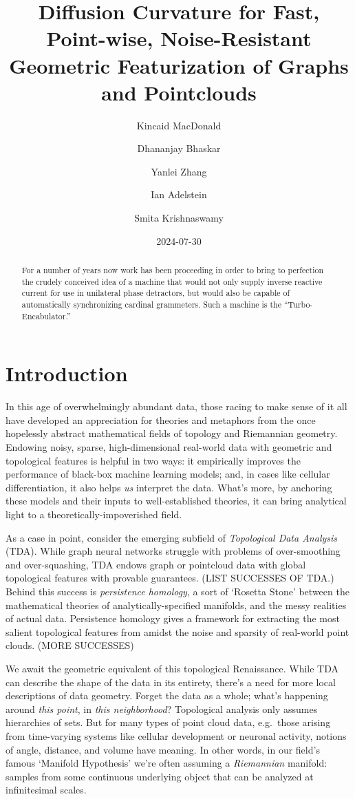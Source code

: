 \documentclass[
  letterpaper,
  DIV=11,
  numbers=noendperiod]{scrartcl}
\title{Diffusion Curvature for Fast, Point-wise, Noise-Resistant
Geometric Featurization of Graphs and Pointclouds}
\author{Kincaid MacDonald \and Dhananjay Bhaskar \and Yanlei
Zhang \and Ian Adelstein \and Smita Krishnaswamy}
\date{2024-07-30}
\theoremstyle{plain}
\theoremstyle{plain}
\theoremstyle{definition}
\theoremstyle{plain}
\theoremstyle{definition}
\theoremstyle{plain}
\theoremstyle{remark}
\begin{document}
\maketitle
\begin{abstract}
For a number of years now work has been proceeding in order to bring to
perfection the crudely conceived idea of a machine that would not only
supply inverse reactive current for use in unilateral phase detractors,
but would also be capable of automatically synchronizing cardinal
grammeters. Such a machine is the ``Turbo-Encabulator.''
\end{abstract}


\newcommand\Kaly[1]{\textcolor{blue}{Kaly: [[[#1]]]}}

\section{Introduction}\label{introduction}

In this age of overwhelmingly abundant data, those racing to make sense
of it all have developed an appreciation for theories and metaphors from
the once hopelessly abstract mathematical fields of topology and
Riemannian geometry. Endowing noisy, sparse, high-dimensional real-world
data with geometric and topological features is helpful in two ways: it
empirically improves the performance of black-box machine learning
models; and, in cases like cellular differentiation, it also helps
\emph{us} interpret the data. What's more, by anchoring these models and
their inputs to well-established theories, it can bring analytical light
to a theoretically-impoverished field.

As a case in point, consider the emerging subfield of \emph{Topological
Data Analysis} (TDA). While graph neural networks struggle with problems
of over-smoothing and over-squashing, TDA endows graph or pointcloud
data with global topological features with provable guarantees. (LIST
SUCCESSES OF TDA.) Behind this success is \emph{persistence homology}, a
sort of `Rosetta Stone' between the mathematical theories of
analytically-specified manifolds, and the messy realities of actual
data. Persistence homology gives a framework for extracting the most
salient topological features from amidst the noise and sparsity of
real-world point clouds. (MORE SUCCESSES)

We await the geometric equivalent of this topological Renaissance. While
TDA can describe the shape of the data in its entirety, there's a need
for more local descriptions of data geometry. Forget the data as a
whole; what's happening around \emph{this point}, in \emph{this
neighborhood}? Topological analysis only assumes hierarchies of sets.
But for many types of point cloud data, e.g.~those arising from
time-varying systems like cellular development or neuronal activity,
notions of angle, distance, and volume have meaning. In other words, in
our field's famous `Manifold Hypothesis' we're often assuming a
\emph{Riemannian} manifold: samples from some continuous underlying
object that can be analyzed at infinitesimal scales.
\end{document}
